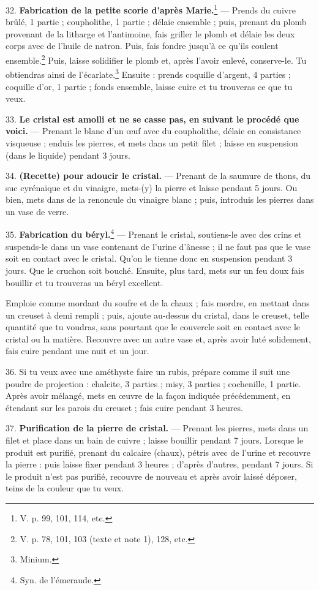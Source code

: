 \documentclass[a4paper, 11pt, oneside, polutonikogreek, french]{article}
\begin{document}
32. \textbf{Fabrication de la petite scorie d'après Marie.}\footnote{V. p. 99, 101, 114, etc.} --- Prends du cuivre brûlé, 1 partie ; coupholithe, 1 partie ; délaie ensemble ; puis, prenant du plomb provenant de la litharge et l'antimoine, fais griller le plomb et délaie les deux corps avec de l'huile de natron. Puis, fais fondre jusqu'à ce qu'ils coulent ensemble.\footnote{V. p. 78, 101, 103 (texte et note 1), 128, etc.} Puis, laisse solidifier le plomb et, après l'avoir enlevé, conserve-le. Tu obtiendras ainsi de l'écarlate.\footnote{Minium.} Ensuite : prends coquille d'argent, 4 parties ; coquille d'or, 1 partie ; fonds ensemble, laisse cuire et tu trouveras ce que tu veux.

33. \textbf{Le cristal est amolli et ne se casse pas, en suivant le procédé que voici.} --- Prenant le blanc d'un œuf avec du coupholithe, délaie en consistance visqueuse ; enduis les pierres, et mets dans un petit filet ; laisse en suspension (dans le liquide) pendant 3 jours.

34. \textbf{(Recette) pour adoucir le cristal.} --- Prenant de la saumure de thons, du suc cyrénaïque et du vinaigre, mets-(y) la pierre et laisse pendant 5 jours. Ou bien, mets dans de la renoncule du vinaigre blanc ; puis, introduis les pierres dans un vase de verre.

35. \textbf{Fabrication du béryl.}\footnote{Syn. de l'émeraude.} --- Prenant le cristal, soutiens-le avec des crins et suspends-le dans un vase contenant de l'urine d'ânesse ; il ne faut pas que le vase soit en contact avec le cristal. Qu'on le tienne donc en suspension pendant 3 jours. Que le cruchon soit bouché. Ensuite, plus tard, mets sur un feu doux fais bouillir et tu trouveras un béryl excellent.

Emploie comme mordant du soufre et de la chaux ; fais mordre, en mettant dans un creuset à demi rempli ; puis, ajoute au-dessus du cristal, dans le creuset, telle quantité que tu voudras, sans pourtant que le couvercle soit en contact avec le cristal ou la matière. Recouvre avec un autre vase et, après avoir luté solidement, fais cuire pendant une nuit et un jour.

36. Si tu veux avec une améthyste faire un rubis, prépare comme il suit une poudre de projection : chalcite, 3 parties ; misy, 3 parties ; cochenille, 1 partie. Après avoir mélangé, mets en œuvre de la façon indiquée précédemment, en étendant sur les parois du creuset ; fais cuire pendant 3 heures.

37. \textbf{Purification de la pierre de cristal.} --- Prenant les pierres, mets dans un filet et place dans un bain de cuivre ; laisse bouillir pendant 7 jours. Lorsque le produit est purifié, prenant du calcaire (chaux), pétris avec de l'urine et recouvre la pierre : puis laisse fixer pendant 3 heures ; d'après d'autres, pendant 7 jours. Si le produit n'est pas purifié, recouvre de nouveau et après avoir laissé déposer, teins de la couleur que tu veux.
\end{document}
